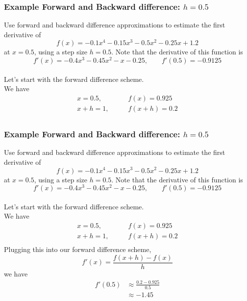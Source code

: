 \documentclass{if-beamer}
\begin{document}
\begin{frame}[t]
\frametitle{Example Forward and Backward difference: $h= 0.5$}
Use forward and backward difference approximations to estimate the first derivative of
$$f(x) = -0.1x^4-0.15x^3-0.5x^2-0.25x+1.2 $$
at $x=0.5$, using a step size $h = 0.5$. Note that the derivative of this function is
$$f'(x) = -0.4x^3-0.45x^2-x-0.25, \qquad f'(0.5) = -0.9125$$
\\\vspace{5pt}
Let's start with the forward difference scheme.\\\vspace{5pt}
We have
\begin{align*}
 x = 0.5, \qquad &f(x) = 0.925\\
 x+h = 1, \qquad &f(x+h) = 0.2\\
\end{align*}
\end{frame}

\begin{frame}[t]
\frametitle{Example Forward and Backward difference: $h= 0.5$}
Use forward and backward difference approximations to estimate the first derivative of
$$f(x) = -0.1x^4-0.15x^3-0.5x^2-0.25x+1.2 $$
at $x=0.5$, using a step size $h = 0.5$. Note that the derivative of this function is
$$f'(x) = -0.4x^3-0.45x^2-x-0.25, \qquad f'(0.5) = -0.9125$$
\\\vspace{5pt}
Let's start with the forward difference scheme.\\\vspace{5pt}
We have
\begin{align*}
x = 0.5, \qquad &f(x) = 0.925\\
x+h = 1, \qquad &f(x+h) = 0.2\\
\end{align*}
Plugging this into our forward difference scheme, 
$$f'(x) = \frac{f(x+h)-f(x)}{h} $$
we have
\begin{align*}
f'(0.5) &\approx \frac{0.2-0.925}{0.5} \\
&\approx -1.45
\end{align*}
\end{frame}
\end{document}
